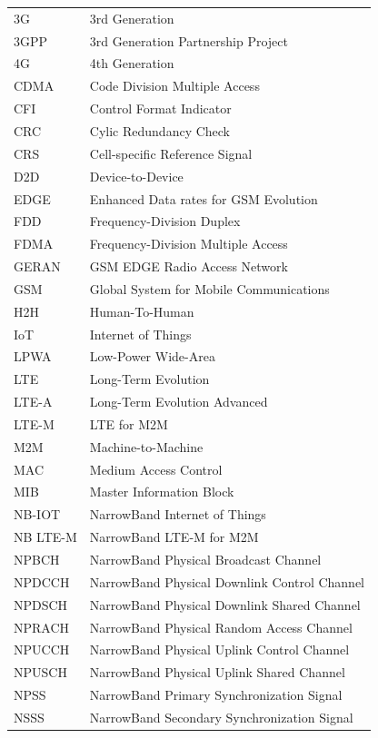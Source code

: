 \documentclass[finnish,12pt,a4paper,pdftex]{article}
\begin{document}
\begin{tabular}{ll}
3G & 3rd Generation \\
3GPP & 3rd Generation Partnership Project \\
4G & 4th Generation \\
CDMA & Code Division Multiple Access \\
CFI & Control Format Indicator \\
CRC & Cylic Redundancy Check \\
CRS & Cell-specific Reference Signal \\
D2D & Device-to-Device \\
EDGE & Enhanced Data rates for GSM Evolution \\
FDD & Frequency-Division Duplex \\
FDMA & Frequency-Division Multiple Access \\
GERAN & GSM EDGE Radio Access Network \\
GSM & Global System for Mobile Communications \\
H2H & Human-To-Human \\
IoT & Internet of Things \\
LPWA & Low-Power Wide-Area \\
LTE & Long-Term Evolution \\
LTE-A & Long-Term Evolution Advanced \\
LTE-M & LTE for M2M \\
M2M & Machine-to-Machine \\
MAC & Medium Access Control \\
MIB & Master Information Block \\
NB-IOT & NarrowBand Internet of Things \\
NB LTE-M & NarrowBand LTE-M for M2M \\
NPBCH & NarrowBand Physical Broadcast Channel \\
NPDCCH & NarrowBand Physical Downlink Control Channel \\
NPDSCH & NarrowBand Physical Downlink Shared Channel \\
NPRACH & NarrowBand Physical Random Access Channel \\
NPUCCH & NarrowBand Physical Uplink Control Channel \\
NPUSCH & NarrowBand Physical Uplink Shared Channel \\
NPSS & NarrowBand Primary Synchronization Signal \\
NSSS & NarrowBand Secondary Synchronization Signal \\

\end{tabular}
\end{document}
